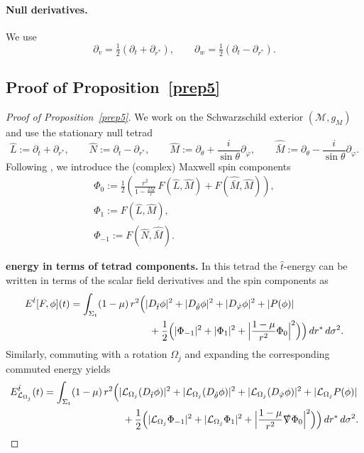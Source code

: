 \documentclass[11pt]{article}
\numberwithin{equation}{section}
\theoremstyle{plain}
\theoremstyle{definition}
\theoremstyle{remark}
\begin{document}
\paragraph{Null derivatives.}
We use
\begin{equation}
\partial_{v}=\tfrac12(\partial_{t}+\partial_{r^{\ast}}),\qquad
\partial_{w}=\tfrac12(\partial_{t}-\partial_{r^{\ast}}).
\end{equation}



\subsection{Proof of Proposition~\ref{prep5}}
\label{app:proof-prep5}

\begin{proof}[Proof of Proposition~\ref{prep5}]
We work on the Schwarzschild exterior $(\mathcal M,g_{M})$ and use the stationary null tetrad
\begin{equation}\label{eq:app5-tetrad}
\hat L:=\partial_{t}+\partial_{r^{\ast}},
\qquad
\hat N:=\partial_{t}-\partial_{r^{\ast}},
\qquad
\hat M:=\partial_{\theta}+\frac{i}{\sin\theta}\partial_{\varphi},
\qquad
\hat{\bar M}:=\partial_{\theta}-\frac{i}{\sin\theta}\partial_{\varphi}.
\end{equation}
Following \cite{mokdad}, we introduce the (complex) Maxwell spin components
\begin{eqnarray}\label{eq:app5-spin}
\Phi_0
:=\frac{1}{2}\left(\frac{r^{2}}{1-\frac{2M}{r}}\,F(\hat L,\hat M)+F(\hat{\bar M},\hat M)\right),\\
\Phi_1 := F(\hat L,\hat M),\\
\Phi_{-1} :=F(\hat N,\hat{\bar M}).
\end{eqnarray}

\medskip
\noindent\textbf{energy in terms of tetrad components.}
In this tetrad the $\hat t$-energy can be written in terms of the scalar field derivatives and the spin components as
\begin{eqnarray}\label{energytimeliketetrad}
E^{\hat{t}}[F,\phi](t)
&=
\int_{\Sigma_t}
(1-\mu)\,r^{2}
\Bigl(
|D_{\hat t}\phi|^{2}
+|D_{\hat\theta}\phi|^{2}
+|D_{\hat\varphi}\phi|^{2}
+|P(\phi)|
\nonumber\\
&\qquad\qquad\qquad\qquad
+\frac12\Bigl(|\Phi_{-1}|^{2}+|\Phi_1|^{2}+\Bigl|\frac{1-\mu}{r^{2}}\Phi_0\Bigr|^{2}\Bigr)
\Bigr)\,dr^{\ast}\,d\sigma^{2}.
\end{eqnarray}
Similarly, commuting with a rotation $\Omega_j$ and expanding the corresponding commuted energy yields
\begin{eqnarray}\label{energyangularijtetrad}
E^{\hat{t}}_{\mathcal{L}_{\Omega_j}}(t)
&=
\int_{\Sigma_t}
(1-\mu)\,r^{2}
\Bigl(
|\mathcal{L}_{\Omega_j}(D_{\hat t}\phi)|^{2}
+|\mathcal{L}_{\Omega_j}(D_{\hat\theta}\phi)|^{2}
+|\mathcal{L}_{\Omega_j}(D_{\hat\varphi}\phi)|^{2}
+|\mathcal{L}_{\Omega_j}P(\phi)|
\nonumber\\
&\qquad\qquad\qquad\qquad
+\frac12\Bigl(|\mathcal{L}_{\Omega_j}\Phi_{-1}|^{2}+|\mathcal{L}_{\Omega_j}\Phi_{1}|^{2}
+\Bigl|\frac{1-\mu}{r^{2}}\slashed\nabla\Phi_{0}\Bigr|^{2}\Bigr)
\Bigr)\,dr^{\ast}\,d\sigma^{2}.
\end{eqnarray}


\end{proof}
\end{document}

